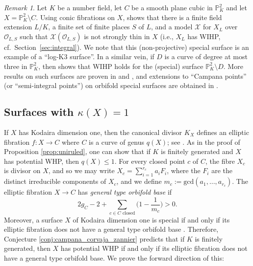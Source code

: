 \documentclass[10pt,a4paper]{amsart}
\theoremstyle{plain}
\theoremstyle{remark}
\newtheorem{remark}[theorem]{Remark}
\numberwithin{theorem}{section}
\begin{document}
\begin{remark}\label{remark:integral_points} Let $K$ be a number field, let $C$ be a smooth plane cubic in $\mathbb{P}^2_K$ and let $X=\mathbb{P}_K^2\setminus C$.
Using conic fibrations on $X$, \cite[Theorem~1.14]{Coccia} shows that there is a finite field extension $L/K$, a finite set of finite places $S$ of $L$, and a model $\mathcal{X}$ for $X_L$ over $\mathcal{O}_{L,S}$ such that $\mathcal{X}(\mathcal{O}_{L,S})$ is not strongly thin in $X$
(i.e., $X_L$ has WIHP, cf.~Section~\ref{sec:integral}). 
 We note that this (non-projective) special surface is an example of a ``log-K3 surface''. 
 In a similar vein, if $D$ is a curve of degree at most three in $\mathbb{P}^2_K$, then  \cite[Theorem~5.2]{Coccia} shows that WIHP holds for the (special) surface $\mathbb{P}^2_K\setminus D$.  
 More results on such surfaces are proven in \cite[Theorem~1.6]{Coccia2} and \cite[Theorem~1.4]{AlessandriLoughran}, 
 and extensions to ``Campana points'' (or ``semi-integral points'') on orbifold  special surfaces are obtained in  \cite{NakaharaStreeter}.  
\end{remark}


\subsection{Surfaces with $\kappa(X)=1$} 
If $X$ has Kodaira dimension one,
then the canonical divisor $K_X$  defines  an elliptic fibration $f\colon X\to C$ where $C$ is a curve of genus $q(X)$; see \cite[Theorem~6.3]{Liedtke}. 
As in the proof of Proposition \ref{prop:uniruled}, one can show that if 
$K$ is finitely generated and
$X$ has potential WHP, then $q(X)\leq 1$.  
For every closed point $c$ of $C$, the fibre $X_c$ is divisor on $X$, and so we may write $X_c = \sum_{i=1}^{r_c} a_i F_i$, where the $F_i$ are the distinct irreducible components of $X_c$,
and we define $m_c:= \mathrm{gcd}(a_1,\dots,a_{r_c})$. 
The elliptic fibration $X\to C$ has \emph{general type orbifold base} if 
\[
2 g_C -2 + \sum_{c\in C \textrm{ closed}} \Big(1-\frac{1}{m_c}\Big) >0.
\] 
Moreover, a surface $X$ of Kodaira dimension one is special if and only if its elliptic fibration does not have a general type orbifold base \cite[Lemma~3.34]{Ca04}.
Therefore, Conjecture \ref{conj:campana_corvaja_zannier}
predicts that if $K$ is finitely generated, then $X$ has potential WHP if and only if its elliptic fibration does not have a general type orbifold base. 
We prove the forward direction of this:
   
\end{document}
